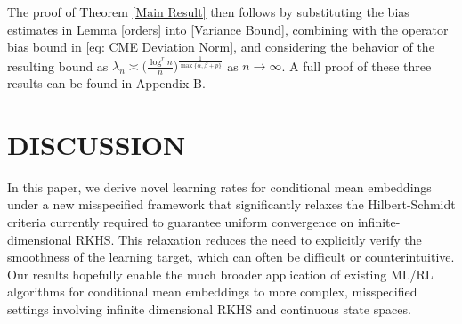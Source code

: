 \documentclass[accepted]{article}
\theoremstyle{definition}
\newtheorem{lemma}[theorem]{Lemma}
\begin{document}
The proof of Theorem \ref{Main Result} then follows by substituting the bias estimates in Lemma \ref{orders} into \eqref{Variance Bound}, combining with the operator bias bound in \eqref{eq: CME Deviation Norm}, and considering the behavior of the resulting bound as $\lambda_n \asymp \Big(\frac{\log^r n}{n}\Big)^{\frac{1}{\max \{\alpha,  \beta + p\}}}$ as $n \to \infty$. A full proof of these three results can be found in Appendix B.

\section{DISCUSSION}
In this paper, we derive novel learning rates for conditional mean embeddings under a new misspecified framework that significantly relaxes the Hilbert-Schmidt criteria currently required to guarantee uniform convergence on infinite-dimensional RKHS. This relaxation reduces the need to explicitly verify the smoothness of the learning target, which can often be difficult or counterintuitive. Our results hopefully enable the much broader application of existing ML/RL algorithms for conditional mean embeddings to more complex, misspecified settings involving infinite dimensional RKHS and continuous state spaces. 
\end{document}
